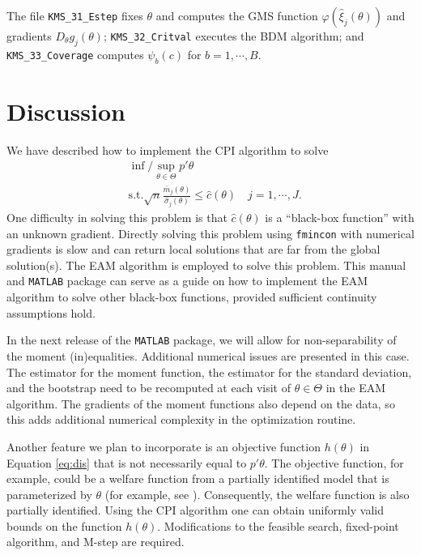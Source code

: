 \documentclass[12pt]{article}
\def\code#1{\texttt{#1}}
\begin{document}
The file \code{KMS\_31\_Estep} fixes $\theta$ and computes the GMS function $\varphi(\hat \xi_j(\theta))$ and gradients $D_{\theta}g_j(\theta)$;   \code{KMS\_32\_Critval} executes the BDM algorithm; and \code{KMS\_33\_Coverage} computes $\psi_b(c)$ for $b=1,\cdots,B$.

\section{Discussion} \label{sec:conclusion}

We have described how to implement the CPI algorithm to solve
\begin{align}\label{eq:dis}
& \inf/\sup_{\theta \in \Theta} p'\theta \\
& \text{s.t.} \sqrt{n} \frac{\bar m_{j}(\theta)}{\hat \sigma_{j}(\theta)} \leq \hat c(\theta) \quad j=1,\cdots,J.
\end{align}
One difficulty in solving this problem is that $\hat c(\theta)$ is a ``black-box function'' with an unknown gradient.  Directly solving this problem using \code{fmincon} with numerical gradients is slow and can return local solutions that are far from the global solution(s). The EAM algorithm is employed to solve this problem. This manual and \code{MATLAB} package can serve as a guide on how to implement the EAM algorithm to solve other black-box functions, provided sufficient continuity assumptions hold.

In the next release of the \code{MATLAB} package, we will allow for non-separability of the moment (in)equalities.  Additional numerical issues are presented in this case.  The estimator for the moment function, the estimator for the standard deviation, and the bootstrap need to be recomputed at each visit of $\theta \in \Theta$ in the EAM algorithm.  The gradients of the moment functions also depend on the data, so this adds additional numerical complexity in the optimization routine.

Another feature we plan to incorporate is an objective function $h(\theta)$ in Equation \eqref{eq:dis} that is not necessarily equal to $p'\theta$. The objective function, for example, could be a welfare function from a partially identified model that is parameterized by $\theta$ (for example, see ).  Consequently, the welfare function is also partially identified.  Using the CPI algorithm one can obtain uniformly valid bounds on the function $h(\theta)$.  Modifications to the feasible search, fixed-point algorithm, and M-step are required.
\end{document}

